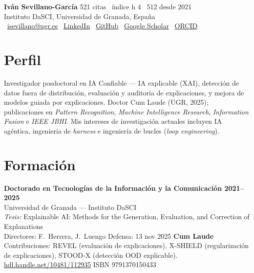 \documentclass[10pt,a4paper]{article}
\newcommand{\blueitem}[1]{\textcolor{subtitleblue}{\textbf{#1}}}
\newcommand{\sub}[1]{\textcolor{subtle}{\footnotesize #1}}
\begin{document}
{\Large \textbf{\textcolor{titleblue}{Iván Sevillano-García}}} \hfill {\footnotesize \textcolor{subtle}{521 citas \textbar\ índice h 4 \textbar\ 512 desde 2021}} \\[0.1em]
{\footnotesize Instituto DaSCI, Universidad de Granada, España} \\[0.1em]
{\footnotesize
\faEnvelope\ \href{mailto:isevillano@ugr.es}{isevillano@ugr.es} \quad
\faGlobe\ \href{https://www.linkedin.com/in/iván-sevillano-garcía-304801116}{LinkedIn} \quad
\faGithub\ \href{https://github.com/isega24}{GitHub} \quad
\faGraduationCap\ \href{https://scholar.google.com/citations?user=g5xyauEAAAAJ}{Google Scholar} \quad
\faOrcid\ \href{https://orcid.org/0000-0002-5029-9106}{ORCID}
}

\vspace{0.3em}

\section*{Perfil}

Investigador posdoctoral en IA Confiable --- IA explicable (XAI), detección de datos fuera de distribución, evaluación y auditoría de explicaciones, y mejora de modelos guiada por explicaciones. Doctor Cum Laude (UGR, 2025); publicaciones en \textit{Pattern Recognition}, \textit{Machine Intelligence Research}, \textit{Information Fusion} e \textit{IEEE JBHI}. Mis intereses de investigación actuales incluyen IA agéntica, ingeniería de \textit{harness} e ingeniería de bucles (\textit{loop engineering}).

\section*{Formación}

\blueitem{Doctorado en Tecnologías de la Información y la Comunicación \hfill 2021--2025} \\
\sub{Universidad de Granada --- Instituto DaSCI} \\
\textit{Tesis:} Explainable AI: Methods for the Generation, Evaluation, and Correction of Explanations \\
\sub{Directores: F.~Herrera, J.~Luengo \quad Defensa: 13 nov 2025 \quad \textbf{Cum Laude}} \\
\sub{Contribuciones: REVEL (evaluación de explicaciones), X-SHIELD (regularización de explicaciones), STOOD-X (detección OOD explicable).} \\
\sub{\href{https://hdl.handle.net/10481/112935}{hdl.handle.net/10481/112935} \quad ISBN 9791370150433}
\end{document}
